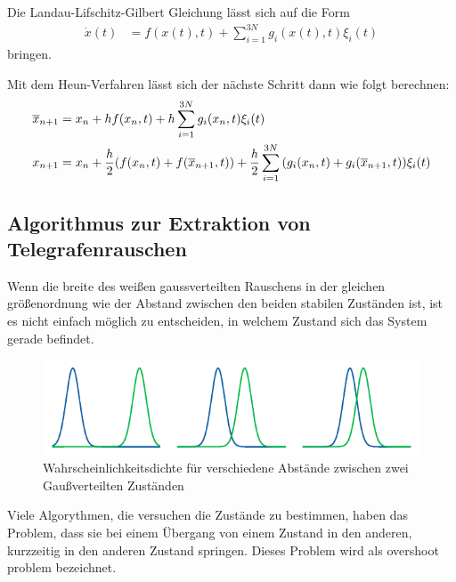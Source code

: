 \documentclass[main.tex]{subfiles}
\begin{document}

Die Landau-Lifschitz-Gilbert Gleichung lässt sich auf die Form
\begin{align}
    \Dot{x}(t) &= f(x(t),t) + \sum_{i=1}^{3N} g_i(x(t),t) \xi_i(t)
\end{align}
bringen. 

Mit dem Heun-Verfahren lässt sich der nächste Schritt dann wie folgt berechnen:
\begin{align}
    \overline{x}_{n+1} &= x_n + h f(x_n,t) + h \sum_{i=1}^{3N} g_i(x_n,t) \xi_i(t) \\
    x_{n+1} &= x_n + \frac{h}{2} \qty(f(x_n,t) + f(\overline{x}_{n+1},t)) + \frac{h}{2} \sum_{i=1}^{3N} \qty(g_i(x_n,t) + g_i(\overline{x}_{n+1},t)) \xi_i(t)
\end{align}



\subsection{Algorithmus zur Extraktion von Telegrafenrauschen}

Wenn die breite des weißen gaussverteilten Rauschens in der gleichen größenordnung wie der Abstand zwischen den beiden stabilen Zuständen ist, ist es nicht einfach möglich zu entscheiden, in welchem Zustand sich das System gerade befindet.
\begin{figure}[h]
    \centering
    \includegraphics{bilder/plots/theo-vis/gauss-overlap.pdf}
    \caption{Wahrscheinlichkeitsdichte für verschiedene Abstände zwischen zwei Gaußverteilten Zuständen \label{fig:gauss-overlap}}
\end{figure}

Viele Algorythmen, die versuchen die Zustände zu bestimmen, haben das Problem, dass sie bei einem Übergang von einem Zustand in den anderen, kurzzeitig in den anderen Zustand springen. Dieses Problem wird als overshoot problem bezeichnet. 
\end{document}
